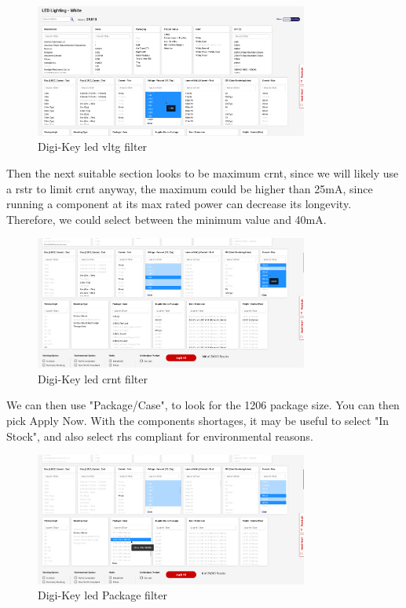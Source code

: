 \documentclass[a4paper,11pt]{report}
\begin{document}
\begin{figure}[H]
\centering
\includegraphics[width=0.8\textwidth]{screenshots/DigiKeyWhiteledPagevoltage}
\caption{Digi-Key \gls{led} \gls{vltg} filter}
\end{figure}

Then the next suitable section looks to be maximum \gls{crnt}, since we will likely use a \gls{rstr} to limit \gls{crnt} anyway, the maximum could be higher than 25mA, since running a component at its max rated power can decrease its longevity. Therefore, we could select between the minimum value and 40mA.

\begin{figure}[H]
\centering
\includegraphics[width=0.8\textwidth]{screenshots/DigiKeyWhiteledPagecurrent}
\caption{Digi-Key \gls{led} \gls{crnt} filter}
\end{figure}

We can then use "Package/Case", to look for the 1206 package size. You can then pick Apply Now. With the components shortages, it may be useful to select "In Stock", and also select \gls{rhs} compliant for environmental reasons.


\begin{figure}[H]
\centering
\includegraphics[width=0.8\textwidth]{screenshots/DigiKeyWhiteledPagePackage}
\caption{Digi-Key \gls{led} Package filter}
\end{figure}
\end{document}
